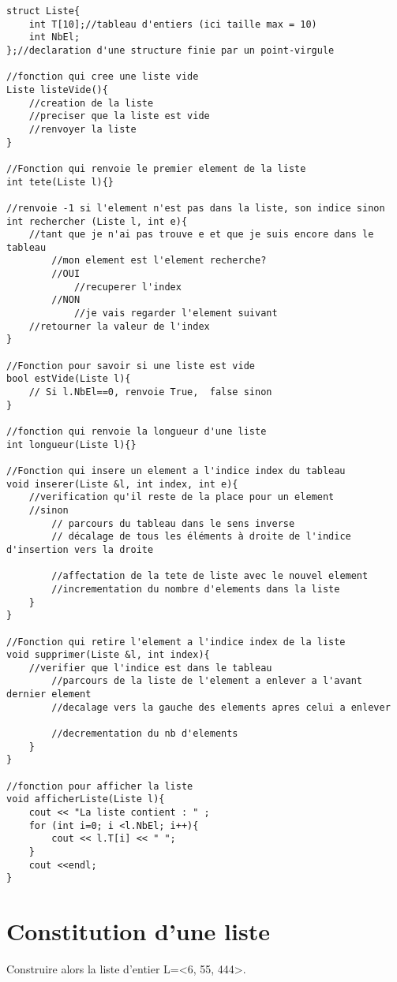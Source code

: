 \documentclass[french]{article}
\begin{document}
	\begin{lstlisting}
struct Liste{
    int T[10];//tableau d'entiers (ici taille max = 10)
    int NbEl;
};//declaration d'une structure finie par un point-virgule

//fonction qui cree une liste vide 
Liste listeVide(){
    //creation de la liste
    //preciser que la liste est vide
    //renvoyer la liste
}

//Fonction qui renvoie le premier element de la liste
int tete(Liste l){}

//renvoie -1 si l'element n'est pas dans la liste, son indice sinon
int rechercher (Liste l, int e){
    //tant que je n'ai pas trouve e et que je suis encore dans le tableau
        //mon element est l'element recherche?
 	   	//OUI
 	   	    //recuperer l'index
 	   	//NON
 	   	    //je vais regarder l'element suivant
    //retourner la valeur de l'index
}

//Fonction pour savoir si une liste est vide
bool estVide(Liste l){
    // Si l.NbEl==0, renvoie True,  false sinon
}

//fonction qui renvoie la longueur d'une liste
int longueur(Liste l){}

//Fonction qui insere un element a l'indice index du tableau
void inserer(Liste &l, int index, int e){
    //verification qu'il reste de la place pour un element
    //sinon
        // parcours du tableau dans le sens inverse 
        // décalage de tous les éléments à droite de l'indice d'insertion vers la droite
        
        //affectation de la tete de liste avec le nouvel element
        //incrementation du nombre d'elements dans la liste
    }
}

//Fonction qui retire l'element a l'indice index de la liste
void supprimer(Liste &l, int index){
    //verifier que l'indice est dans le tableau
        //parcours de la liste de l'element a enlever a l'avant dernier element
        //decalage vers la gauche des elements apres celui a enlever
          
        //decrementation du nb d'elements
    }
}

//fonction pour afficher la liste
void afficherListe(Liste l){
    cout << "La liste contient : " ;
    for (int i=0; i <l.NbEl; i++){
        cout << l.T[i] << " ";
    }
    cout <<endl;
}
	\end{lstlisting}
	
	\section{Constitution d’une liste}
	Construire alors la liste d’entier L=<6, 55, 444>.
	
\end{document}
